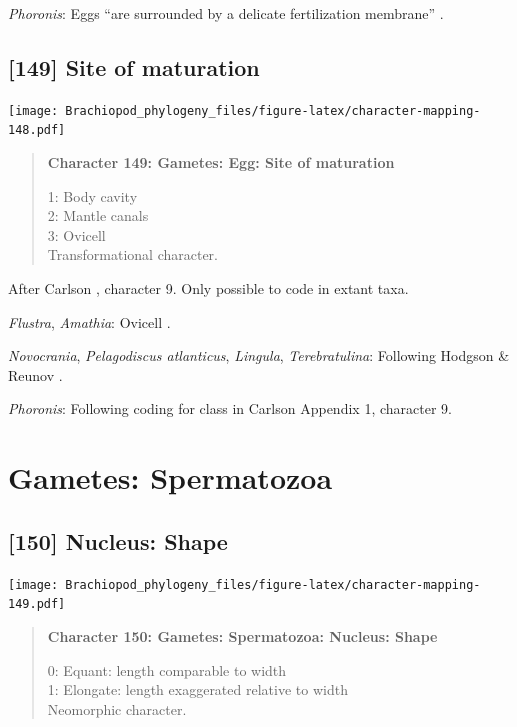 \documentclass[openany]{book}
\begin{document}
\hypertarget{Phoronis-coding-148}{}
\emph{Phoronis}: Eggs ``are surrounded by a delicate fertilization
membrane'' \citep{Pennerstorfer2012}.

\subsection*{{[}149{]} Site of maturation}\label{site-of-maturation}

\texttt{[image: Brachiopod\_phylogeny\_files/figure-latex/character-mapping-148.pdf]}

\begin{quote}
\textbf{Character 149: Gametes: Egg: Site of maturation}

1: Body cavity\\
2: Mantle canals\\
3: Ovicell\\
Transformational character.
\end{quote}

After Carlson \citeyearpar{Carlson1995Phylogeneticrelationships},
character 9. Only possible to code in extant taxa.

\hypertarget{Amathia-coding-149}{}
\emph{Flustra}, \emph{Amathia}: Ovicell \citep{Franzen1977}.

\hypertarget{Lingula-coding-149}{}
\emph{Novocrania}, \emph{Pelagodiscus atlanticus}, \emph{Lingula},
\emph{Terebratulina}: Following Hodgson \& Reunov
\citeyearpar{Hodgson1994Ultrastructureof}.

\hypertarget{Phoronis-coding-149}{}
\emph{Phoronis}: Following coding for class in Carlson
\citeyearpar{Carlson1995Phylogeneticrelationships} Appendix 1, character
9.

\section{Gametes: Spermatozoa}\label{gametes-spermatozoa}

\subsection*{{[}150{]} Nucleus: Shape}\label{nucleus-shape}

\texttt{[image: Brachiopod\_phylogeny\_files/figure-latex/character-mapping-149.pdf]}

\begin{quote}
\textbf{Character 150: Gametes: Spermatozoa: Nucleus: Shape}

0: Equant: length comparable to width\\
1: Elongate: length exaggerated relative to width\\
Neomorphic character.
\end{quote}
\end{document}
